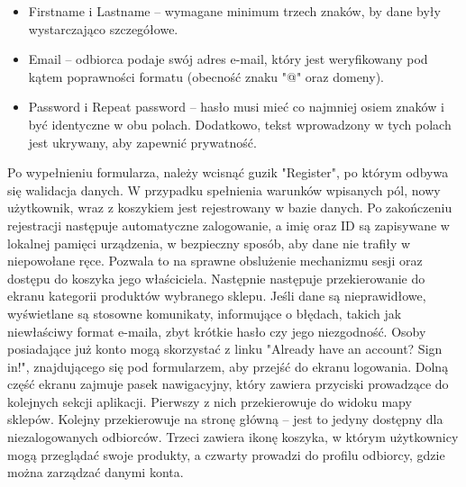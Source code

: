 \begin{itemize} \item Firstname i Lastname – wymagane minimum trzech znaków, by dane były wystarczająco szczegółowe. \item Email – odbiorca podaje swój adres e-mail, który jest weryfikowany pod kątem poprawności formatu (obecność znaku "@" oraz domeny). \item Password i Repeat password – hasło musi mieć co najmniej osiem znaków i być identyczne w obu polach. Dodatkowo, tekst wprowadzony w tych polach jest ukrywany, aby zapewnić prywatność. \end{itemize}

Po wypełnieniu formularza, należy wcisnąć guzik "Register", po którym odbywa się walidacja danych. W przypadku spełnienia warunków wpisanych pól, nowy użytkownik, wraz z koszykiem jest rejestrowany w bazie danych. Po zakończeniu rejestracji następuje automatyczne zalogowanie, a imię oraz ID są zapisywane w lokalnej pamięci urządzenia, w bezpieczny sposób, aby dane nie trafiły w niepowołane ręce. Pozwala to na sprawne obslużenie mechanizmu sesji oraz dostępu do koszyka jego właściciela. Następnie następuje przekierowanie do ekranu kategorii produktów wybranego sklepu. Jeśli dane są nieprawidłowe, wyświetlane są stosowne komunikaty, informujące o błędach, takich jak niewłaściwy format e-maila, zbyt krótkie hasło czy jego niezgodność. Osoby posiadające już konto mogą skorzystać z linku "Already have an account? Sign in!", znajdującego się pod formularzem, aby przejść do ekranu logowania. Dolną część ekranu zajmuje pasek nawigacyjny, który zawiera przyciski prowadzące do kolejnych sekcji aplikacji. Pierwszy z nich przekierowuje do widoku mapy sklepów. Kolejny przekierowuje na stronę główną – jest to jedyny dostępny dla niezalogowanych odbiorców. Trzeci zawiera ikonę koszyka, w którym użytkownicy mogą przeglądać swoje produkty, a czwarty prowadzi do profilu odbiorcy, gdzie można zarządzać danymi konta.

